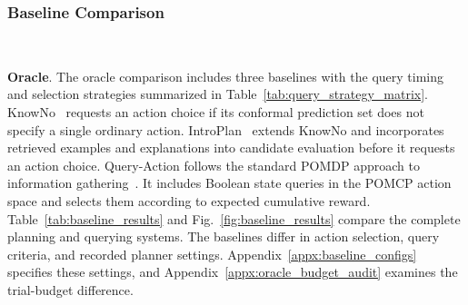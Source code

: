 \subsubsection{Baseline Comparison}~\label{exp:sys_baseline}

\noindent\textbf{Oracle}. The oracle comparison includes three baselines with the query timing and selection strategies summarized in Table~\ref{tab:query_strategy_matrix}. KnowNo~\cite{ren2023robots} requests an action choice if its conformal prediction set does not specify a single ordinary action. IntroPlan~\cite{liang2024introspective} extends KnowNo and incorporates retrieved examples and explanations into candidate evaluation before it requests an action choice. Query-Action follows the standard POMDP approach to information gathering~\cite{kaelbling1998planning}. It includes Boolean state queries in the POMCP action space and selects them according to expected cumulative reward. Table~\ref{tab:baseline_results} and Fig.~\ref{fig:baseline_results} compare the complete planning and querying systems. The baselines differ in action selection, query criteria, and recorded planner settings. Appendix~\ref{appx:baseline_configs} specifies these settings, and Appendix~\ref{appx:oracle_budget_audit} examines the trial-budget difference. 

